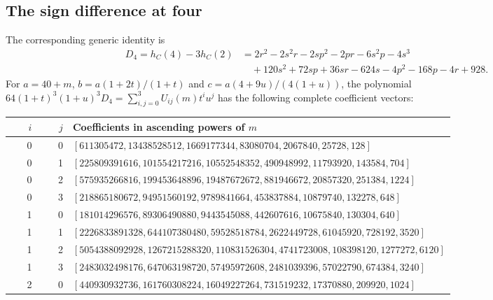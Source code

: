 \clearpage
\subsection{The sign difference at four}

The corresponding generic identity is
\begin{align*}
D_4=h_C(4)-3h_C(2)
 &=2r^2-2s^2r-2sp^2-2pr-6s^2p-4s^3\\
 &\quad+120s^2+72sp+36sr-624s-4p^2-168p-4r+928.
\end{align*}
For $a=40+m$, $b=a(1+2t)/(1+t)$ and $c=a(4+9u)/(4(1+u))$,
the polynomial $64(1+t)^3(1+u)^3D_4=\sum_{i,j=0}^3 U_{ij}(m)t^iu^j$
has the following complete coefficient vectors:
\begin{center}
\footnotesize
\setlength{\tabcolsep}{4pt}
\begin{tabular}{rrp{0.86\linewidth}}
\toprule
$i$ & $j$ & Coefficients in ascending powers of $m$ \\
\midrule
0 & 0 & $[611305472,\allowbreak 13438528512,\allowbreak 1669177344,\allowbreak 83080704,\allowbreak 2067840,\allowbreak 25728,\allowbreak 128]$ \\
0 & 1 & $[225809391616,\allowbreak 101554217216,\allowbreak 10552548352,\allowbreak 490948992,\allowbreak 11793920,\allowbreak 143584,\allowbreak 704]$ \\
0 & 2 & $[575935266816,\allowbreak 199453648896,\allowbreak 19487672672,\allowbreak 881946672,\allowbreak 20857320,\allowbreak 251384,\allowbreak 1224]$ \\
0 & 3 & $[218865180672,\allowbreak 94951560192,\allowbreak 9789841664,\allowbreak 453837884,\allowbreak 10879740,\allowbreak 132278,\allowbreak 648]$ \\
1 & 0 & $[181014296576,\allowbreak 89306490880,\allowbreak 9443545088,\allowbreak 442607616,\allowbreak 10675840,\allowbreak 130304,\allowbreak 640]$ \\
1 & 1 & $[2226833891328,\allowbreak 644107380480,\allowbreak 59528518784,\allowbreak 2622449728,\allowbreak 61045920,\allowbreak 728192,\allowbreak 3520]$ \\
1 & 2 & $[5054388092928,\allowbreak 1267215288320,\allowbreak 110831526304,\allowbreak 4741723008,\allowbreak 108398120,\allowbreak 1277272,\allowbreak 6120]$ \\
1 & 3 & $[2483032498176,\allowbreak 647063198720,\allowbreak 57495972608,\allowbreak 2481039396,\allowbreak 57022790,\allowbreak 674384,\allowbreak 3240]$ \\
2 & 0 & $[440930932736,\allowbreak 161760308224,\allowbreak 16049227264,\allowbreak 731519232,\allowbreak 17370880,\allowbreak 209920,\allowbreak 1024]$ \\

\end{tabular}
\end{center}
